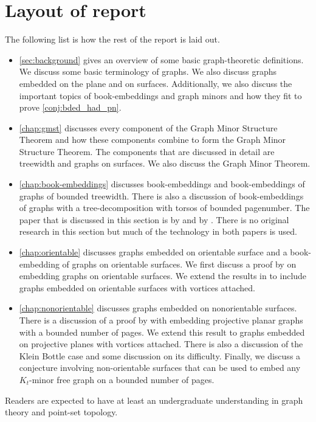 \section{Layout of report}
The following list is how the rest of the report is laid out. 
\begin{itemize}
	\item \cref{sec:background} gives an overview of some basic graph-theoretic definitions. We discuss some basic terminology of graphs. We also discuss graphs embedded on the plane and on surfaces. Additionally, we also discuss the important topics of book-embeddings and graph minors and how they fit to prove \cref{conj:bded_had_pn}. 
	\item \cref{chap:gmst} discusses every component of the Graph Minor Structure Theorem and how these components combine to form the Graph Minor Structure Theorem. The components that are discussed in detail are treewidth and graphs on surfaces. We also discuss the Graph Minor Theorem. 
	\item \cref{chap:book-embeddings} discusses book-embeddings and book-embeddings of graphs of bounded treewidth. There is also a discussion of book-embeddings of graphs with a tree-decomposition with torsos of bounded pagenumber. The paper that is discussed in this section is by \textcite{hickingbothamStackNumberCliqueSum2023} and by \textcite{ganleyPagenumberTrees2001}. There is no original research in this section but much of the technology in both papers is used. 
	\item \cref{chap:orientable} discusses graphs embedded on orientable surface and a book-embedding of graphs on orientable surfaces. We first discuss a proof by \textcite{heathPagenumberGenusGraphs1992} on embedding graphs on orientable surfaces. We extend the results in \textcite{heathPagenumberGenusGraphs1992} to include graphs embedded on orientable surfaces with vortices attached. 
	\item \cref{chap:nonorientable} discusses graphs embedded on nonorientable surfaces. There is a discussion of a proof by \textcite{nakamotoBookEmbeddingProjectiveplanar2015} with embedding projective planar graphs with a bounded number of pages. We extend this result to graphs embedded on projective planes with vortices attached. There is also a discussion of the Klein Bottle case and some discussion on its difficulty. Finally, we discuss a conjecture involving non-orientable surfaces that can be used to embed any $K_t$-minor free graph on a bounded number of pages. 
\end{itemize}

Readers are expected to have at least an undergraduate understanding in graph theory and point-set topology. 
